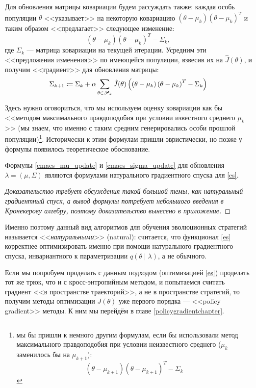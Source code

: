 Для обновления матрицы ковариации будем рассуждать также: каждая особь популяции $\theta$ <<указывает>> на некоторую ковариацию $\left( \theta - \mu_k \right)\left( \theta - \mu_k \right)^T$ и таким образом <<предлагает>> следующее изменение:
$$\left( \theta - \mu_k \right)\left( \theta - \mu_k \right)^T - \Sigma_k,$$
где $\Sigma_k$ --- матрица ковариации на текущей итерации. Усредним эти <<предложения изменения>> по имеющейся популяции, взвесив их на $\hat{J}(\theta)$, и получим <<градиент>> для обновления матрицы:
\begin{equation}\label{cmaes_sigma_update}
\Sigma_{k+1} \coloneqq \Sigma_k + \alpha \sum_{\theta \in \mathscr{P}_k} \hat{J}(\theta) \left( \left( \theta - \mu_k \right)\left( \theta - \mu_k \right)^T - \Sigma_k \right)
\end{equation}

Здесь нужно оговориться, что мы используем оценку ковариации как бы <<методом максимального правдоподобия при условии известного среднего $\mu_k$>> (мы знаем, что именно с таким средним генерировались особи прошлой популяции)\footnote{мы бы пришли к немного другим формулам, если бы использовали метод максимального правдоподобия при условии неизвестного среднего ($\mu_k$ заменилось бы на $\mu_{k+1}$):
$$\left( \theta - \mu_{k+1} \right)\left( \theta - \mu_{k+1} \right)^T - \Sigma_k$$}. Исторически к этим формулам пришли эвристически, но позже у формулы появилось теоретическое обоснование.

\begin{theorem}
Формулы \eqref{cmaes_mu_update} и \eqref{cmaes_sigma_update} для обновления $\lambda = (\mu, \Sigma)$ являются формулами натурального градиентного спуска для \eqref{es}.
\begin{proof}[Доказательство требует обсуждения такой большой темы, как натуральный градиентный спуск, а вывод формулы потребует небольшого введения в Кронекерову алгебру, поэтому доказательство вынесено в приложение] 
\end{proof}
\end{theorem}

Именно поэтому данный вид алгоритмов для обучения эволюционных стратегий называется <<\emph{натуральными}>> (natural): считается, что функционал \eqref{es} корректнее оптимизировать именно при помощи натурального градиентного спуска, инвариантного к параметризации $q(\theta \mid \lambda)$, а не обычного.

\begin{example}
\begin{center}
\end{center}
\end{example}

Если мы попробуем проделать с данным подходом (оптимизацией \eqref{es}) проделать тот же трюк, что и с кросс-энтропийным методом, и попытаемся считать градиент <<в пространстве траекторий>>, а не в пространстве стратегий, то получим методы оптимизации $J(\theta)$ уже первого порядка --- <<policy gradient>> методы. К ним мы перейдём в главе \ref{policygradientchapter}.